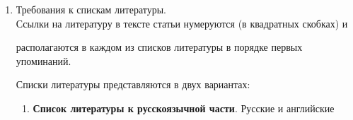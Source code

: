 {{\begin{enumerate}[1.]
\begin{itemize}
резюме работы, которое может публиковаться отдельно. Она является основным


источником информации в информационных системах и базах данных. Английская


аннотация должна быть оригинальной, может не быть дословным переводом русского


текста и должна быть написана хорошим английским языком. В~аннотации не должно


быть ссылок на литературу и, по возможности, формул;\\[-12.8pt]


\item ключевые слова~--- желательно из принятых в мировой


на\-уч\-но-тех\-ни\-че\-ской литературе тематических тезаурусов. Предложения не


могут быть ключевыми словами.\\[-12.8pt]


\item источники финансирования работы (ссылкм на гранты, проекты, поддерживающие


организации и~т.\,п.


\end{itemize}










\item  Требования к спискам литературы.\\[-12pt]





Ссылки на литературу в тексте статьи нумеруются (в квадратных скобках) и


располагаются в каждом из списков литературы в порядке  первых упоминаний.





\pagebreak





Списки литературы представляются в двух вариантах:\\[-14pt]


\begin{enumerate}[(1)]


\item \textbf{Список литературы к русскоязычной части}. Русские и английские



\end{enumerate}
\end{enumerate}}}
